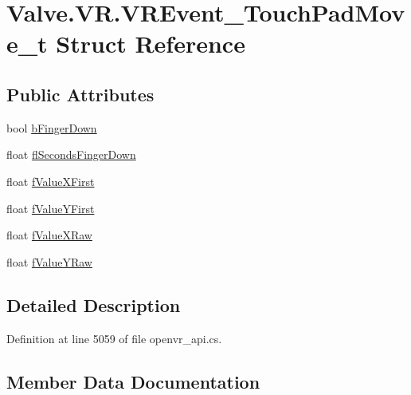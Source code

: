 \hypertarget{struct_valve_1_1_v_r_1_1_v_r_event___touch_pad_move__t}{}\section{Valve.\+V\+R.\+V\+R\+Event\+\_\+\+Touch\+Pad\+Move\+\_\+t Struct Reference}
\label{struct_valve_1_1_v_r_1_1_v_r_event___touch_pad_move__t}
\subsection*{Public Attributes}
\begin{DoxyCompactItemize}
\item 
bool \mbox{\hyperlink{struct_valve_1_1_v_r_1_1_v_r_event___touch_pad_move__t_a65678aaec38f5e55220f8526d0a070ae}{b\+Finger\+Down}}
\item 
float \mbox{\hyperlink{struct_valve_1_1_v_r_1_1_v_r_event___touch_pad_move__t_afee92e840cd1d473d672e43385d36c98}{fl\+Seconds\+Finger\+Down}}
\item 
float \mbox{\hyperlink{struct_valve_1_1_v_r_1_1_v_r_event___touch_pad_move__t_a9426b3c5bb09440e1e4a784a062ef497}{f\+Value\+X\+First}}
\item 
float \mbox{\hyperlink{struct_valve_1_1_v_r_1_1_v_r_event___touch_pad_move__t_afbf018022c69ddc20dc3e64776a7073d}{f\+Value\+Y\+First}}
\item 
float \mbox{\hyperlink{struct_valve_1_1_v_r_1_1_v_r_event___touch_pad_move__t_a4245f71849c2d7d13c0c6173a773d4fa}{f\+Value\+X\+Raw}}
\item 
float \mbox{\hyperlink{struct_valve_1_1_v_r_1_1_v_r_event___touch_pad_move__t_a80c16bce15dca832a200f1c67333f5ee}{f\+Value\+Y\+Raw}}
\end{DoxyCompactItemize}


\subsection{Detailed Description}


Definition at line 5059 of file openvr\+\_\+api.\+cs.



\subsection{Member Data Documentation}
\mbox{\label{struct_valve_1_1_v_r_1_1_v_r_event___touch_pad_move__t_a65678aaec38f5e55220f8526d0a070ae}} 

